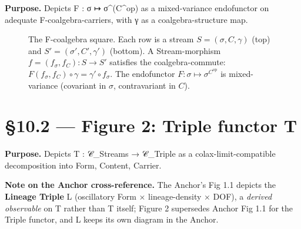 \documentclass[11pt, openany]{book}
\newcommand{\sectionbreak}{\clearpage}
\begin{document}
\textbf{Purpose.} Depicts F : σ ↦ σ\textasciicircum{}(C\textasciicircum{}op) as a mixed-variance endofunctor on adequate F-coalgebra-carriers, with γ as a coalgebra-structure map.

\begin{figure}[htbp]
\centering
{}
\caption{The F-coalgebra square. Each row is a stream $S = (\sigma, C, \gamma)$ (top) and $S' = (\sigma', C', \gamma')$ (bottom). A Stream-morphism $f = (f_\sigma, f_C) : S \to S'$ satisfies the coalgebra-commute: $F(f_\sigma, f_C) \circ \gamma = \gamma' \circ f_\sigma$. The endofunctor $F : \sigma \mapsto \sigma^{C^{\mathrm{op}}}$ is mixed-variance (covariant in $\sigma$, contravariant in $C$).}
\label{fig:f-coalgebra-square}
\end{figure}

\sectionbreak

\section{§10.2 --- Figure 2: Triple functor T}

\textbf{Purpose.} Depicts T : 𝒞\_\allowbreak{}Streams → 𝒞\_\allowbreak{}Triple as a colax-limit-compatible decomposition into Form, Content, Carrier.

\textbf{Note on the Anchor cross-reference.} The Anchor's Fig 1.1 depicts the \textbf{Lineage Triple} L (oscillatory Form × lineage-density × DOF), a \textit{derived observable} on T rather than T itself; Figure 2 supersedes Anchor Fig 1.1 for the Triple functor, and L keeps its own diagram in the Anchor.
\end{document}
